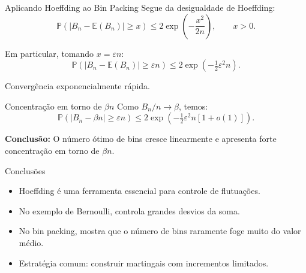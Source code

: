 \documentclass{beamer}
\begin{document}
\begin{frame}{Aplicando Hoeffding ao Bin Packing}
Segue da desigualdade de Hoeffding:
\[
\mathbb{P}\left(|B_n - \mathbb{E}(B_n)| \ge x \right)
\le 2\exp\!\left( -\frac{x^2}{2n} \right),
\qquad x>0.
\]

Em particular, tomando $x = \varepsilon n$:
\[
\mathbb{P}\!\left(|B_n - \mathbb{E}(B_n)| \ge \varepsilon n\right)
\le 
2 \exp\!\left(-\tfrac{1}{2}\varepsilon^2 n\right).
\]

\medskip

Convergência exponencialmente rápida.
\end{frame}

\begin{frame}{Concentração em torno de \texorpdfstring{$\beta n$}{βn}}
Como $B_n/n \to \beta$, temos:
\[
\mathbb{P}\!\left(|B_n - \beta n| \ge \varepsilon n \right)
\le 
2 \exp\!\left(-\tfrac{1}{2}\varepsilon^2 n[1+o(1)]\right).
\]

\bigskip

\textbf{Conclusão:}  
O número ótimo de bins cresce linearmente e apresenta forte concentração em torno de $\beta n$.
\end{frame}

\begin{frame}{Conclusões}
\begin{itemize}
    \item Hoeffding é uma ferramenta essencial para controle de flutuações.
    \item No exemplo de Bernoulli, controla grandes desvios da soma.
    \item No bin packing, mostra que o número de bins raramente foge muito do valor médio.
    \item Estratégia comum: construir martingais com incrementos limitados.
\end{itemize}
\end{frame}
\end{document}
